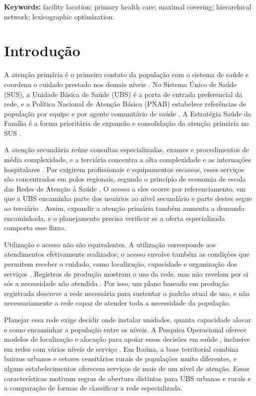 \documentclass[12pt,a4paper,oneside]{report}
\begin{document}
\noindent\textbf{Keywords:} facility location; primary health care; maximal covering; hierarchical network;
lexicographic optimization.

\FloatBarrier
\clearpage\tableofcontents\clearpage\listoftables\clearpage\listoffigures\clearpage

\chapter{Introdução}

A atenção primária é o primeiro contato da população com o sistema de saúde e coordena o cuidado
prestado nos demais níveis \citep{mendes2010}. No Sistema Único de Saúde (SUS), a Unidade Básica de
Saúde (UBS) é a porta de entrada preferencial da rede, e a Política Nacional de Atenção Básica (PNAB)
estabelece referências de população por equipe e por agente comunitário de saúde \citep{pnab2017}. A
Estratégia Saúde da Família é a forma prioritária de expansão e consolidação da atenção primária no SUS
\citep{pnab2017}.

A atenção secundária reúne consultas especializadas, exames e procedimentos de média complexidade, e a
terciária concentra a alta complexidade e as internações hospitalares \citep{mendes2010}. Por exigirem
profissionais e equipamentos escassos, esses serviços são concentrados em polos regionais, segundo o
princípio de economia de escala das Redes de Atenção à Saúde \citep{brasil2010}. O acesso a eles ocorre
por referenciamento, em que a UBS encaminha parte dos usuários ao nível secundário e parte destes segue
ao terciário \citep{brasil2011,sahin2007}. Assim, expandir a atenção primária também aumenta a demanda
encaminhada, e o planejamento precisa verificar se a oferta especializada comporta esse fluxo.

Utilização e acesso não são equivalentes. A utilização corresponde aos atendimentos efetivamente
realizados; o acesso envolve também as condições que permitem receber o cuidado, como localização,
capacidade e organização dos serviços \citep{aday1974,santana2023}. Registros de produção mostram o uso
da rede, mas não revelam por si sós a necessidade não atendida \citep{santana2023}. Por isso, um plano
baseado em produção registrada descreve a rede necessária para sustentar o padrão atual de uso, e não
necessariamente a rede capaz de atender toda a necessidade da população.

Planejar essa rede exige decidir onde instalar unidades, quanta capacidade alocar e como encaminhar
a população entre os níveis. A Pesquisa Operacional oferece modelos de localização e alocação para
apoiar essas decisões em saúde
\citep{daskin2004,ahmadi2017}, inclusive em redes com vários níveis de serviço \citep{sahin2007,hodgson1988}. Em
Itaúna, a base territorial combina bairros urbanos e setores censitários rurais de populações muito
diferentes, e alguns estabelecimentos oferecem serviços de mais de um nível de atenção. Essas
características motivam regras de abertura distintas para UBS urbanas e rurais e a comparação de formas
de classificar a rede especializada.
\end{document}
